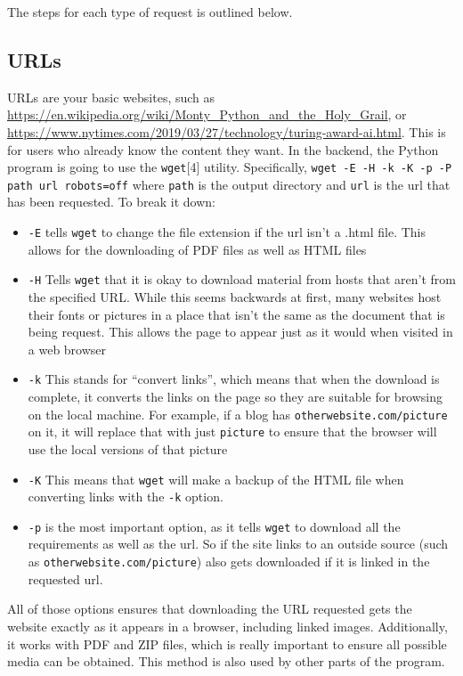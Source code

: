 \documentclass{article}
\begin{document}
The steps for each type of request is outlined below.

\subsection{URLs}

URLs are your basic websites, such as
\url{https://en.wikipedia.org/wiki/Monty_Python_and_the_Holy_Grail},
or
\url{https://www.nytimes.com/2019/03/27/technology/turing-award-ai.html}. This
is for users who already know the content they want. In the backend,
the Python program is going to use the \texttt{wget}[4]
utility. Specifically, \texttt{wget -E -H -k -K -p -P path url
  robots=off} where \texttt{path} is the output directory and
\texttt{url} is the url that has been requested. To break it down:
\begin{itemize}
  \item \texttt{-E} tells \texttt{wget} to change the file extension
    if the url isn't a .html file. This allows for the downloading of
    PDF files as well as HTML files
  \item \texttt{-H} Tells \texttt{wget} that it is okay to download
    material from hosts that aren't from the specified URL. While this
    seems backwards at first, many websites host their fonts or
    pictures in a place that isn't the same as the document that is
    being request. This allows the page to appear just as it would
    when visited in a web browser
  \item \texttt{-k} This stands for ``convert links'', which means
    that when the download is complete, it converts the links on the
    page so they are suitable for browsing on the local machine. For
    example, if a blog has \texttt{otherwebsite.com/picture} on it, it
    will replace that with just \texttt{picture} to ensure that the
    browser will use the local versions of that picture
  \item \texttt{-K} This means that \texttt{wget} will make a backup
    of the HTML file when converting links with the \texttt{-k}
    option.
  \item \texttt{-p} is the most important option, as it tells
    \texttt{wget} to download all the requirements as well as the
    url. So if the site links to an outside source (such as
    \texttt{otherwebsite.com/picture}) also gets downloaded if it is
    linked in the requested url.
  \end{itemize}
All of those options ensures that downloading the URL requested gets
the website exactly as it appears in a browser, including linked
images. Additionally, it works with PDF and ZIP files, which is really
important to ensure all possible media can be obtained. This method is
also used by other parts of the program.
\end{document}
